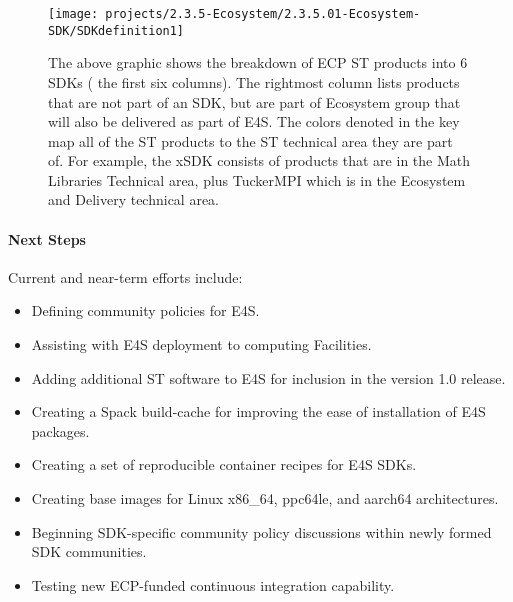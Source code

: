 \begin{figure}[htb]
        \centering
        \texttt{[image: projects/2.3.5-Ecosystem/2.3.5.01-Ecosystem-SDK/SDKdefinition1]}
        \caption{\label{fig:sdk-definition1}The above graphic shows the breakdown of ECP ST products into 6 SDKs ( the first six columns).  The rightmost column lists products that are not part of an SDK, but are part of Ecosystem group that will also be delivered as part of E4S. The colors denoted in the key map all of the ST products to the ST technical area they are part of.  For example, the xSDK consists of products that are in the Math Libraries Technical area, plus TuckerMPI which is in the Ecosystem and Delivery technical area.}
\end{figure}

\paragraph{Next Steps}
Current and near-term efforts include:

\begin{itemize}
\item  Defining community policies for E4S.
\item  Assisting with E4S deployment to computing Facilities.
\item  Adding additional ST software to E4S for inclusion in the version 1.0 release.
\item  Creating a Spack build-cache for improving the ease of installation of E4S packages. 
\item  Creating a set of reproducible container recipes for E4S SDKs.
\item  Creating base images for Linux x86\_64, ppc64le, and aarch64 architectures.
\item  Beginning SDK-specific community policy discussions within newly formed SDK communities.
\item  Testing new ECP-funded continuous integration capability.
\end{itemize}

